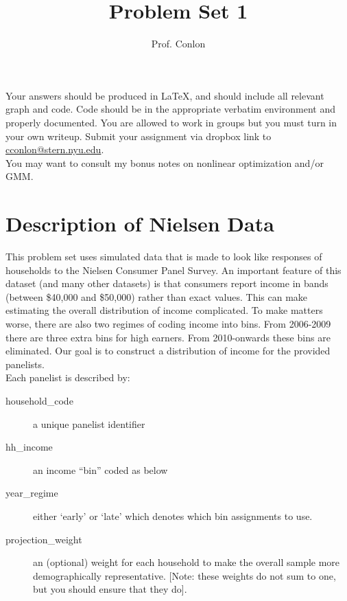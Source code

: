 \documentclass{article}
\title{Problem Set 1}
\begin{document}
\small
\date{}
\author{Prof. Conlon}
\maketitle
Your answers should be produced in \LaTeX, and should include all relevant graph and code.  Code should be in the appropriate verbatim environment and properly documented. You are allowed to work in groups but you must turn in your own writeup. Submit your assignment via dropbox link to \href{mailto:cconlon@stern.nyu.edu}{cconlon@stern.nyu.edu}.\\

You may want to consult my bonus notes on nonlinear optimization and/or GMM.

\section*{\normalsize Description of Nielsen Data}
This problem set uses simulated data that is made to look like responses of households to the Nielsen Consumer Panel Survey. An important feature of this dataset (and many other datasets) is that consumers report income in bands (between \$40,000 and \$50,000) rather than exact values. This can make estimating the overall distribution of income complicated. To make matters worse, there are also two regimes of coding income into bins. From 2006-2009 there are three extra bins for high earners. From 2010-onwards these bins are eliminated. Our goal is to construct a distribution of income for the provided panelists.\\

\noindent Each panelist is described by:
\begin{description}
\item[household\_code] a unique panelist identifier
\item[hh\_income] an income ``bin'' coded as below
\item[year\_regime] either `early' or `late' which denotes which bin assignments to use.
\item[projection\_weight] an (optional) weight for each household to make the overall sample more demographically representative. [Note: these weights do not sum to one, but you should ensure that they do].
\end{description}
\end{document}
